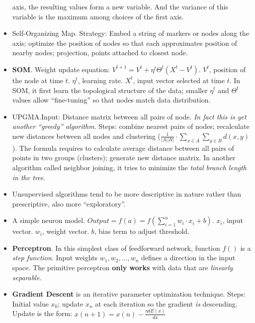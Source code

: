 \documentclass[twocolumn]{article}
\begin{document}
\begin{itemize}
  axis, the resulting values form a new variable. And the variance of
  this variable is the maximum among choices of the first axis.
\item Self-Organizing Map. Strategy: Embed a string of markers or
  nodes along the axis; optimize the position of nodes so that each
  approximates position of nearby nodes; projection, points attached
  to closest node.
\item \textbf{SOM}. Weight update equation:
  $V^{t+1}=V^{t}+\eta^{t}\Theta^{t}(X^{t}-V^{t})$. $V^{t}$, position
  of the node at time $t$. $\eta^{t}$, learning rate. $X^{t}$, input
  vector selected at time $t$. In SOM, it first learn the topological
  structure of the data; smaller $\eta^{t}$ and $\Theta^{t}$ values
  allow ``fine-tuning'' so that nodes match data distribution. 
\item UPGMA.\@ Input: Distance matrix between all pairs of
  node. \emph{In fact this is yet another ``greedy''
    algorithm}. Steps: combine nearest pairs of nodes; recalculate new
  distances between all nodes and clustering ($\frac{1}{|A||B|}\cdot
  \sum_{x\in A}\sum_{y\in B}d(x,y)$). The formula requires to
  calculate average distance between all pairs of points in two groups
  (clusters); generate new distance matrix. In another algorithm
  called neighbor joining, it tries to minimize the \emph{total branch
  length in the tree}.
\item Unsupervised algorithms tend to be more descriptive in nature
  rather than prescriptive, also more ``exploratory''. 
\item A simple neuron model. $Output=f(a)=f(\sum_{i=1}^{n}w_{i}\cdot
  x_{i}+b)$. $x_{i}$, input vector. $w_{i}$, weight vector. $b$, bias
  term to adjust threshold. 
\item \textbf{Perceptron}. In this simplest class of feedforward
  network, function $f()$ is a \emph{step function}. Input weights
  $w_{1},w_{2}, \ldots, w_{n}$ defines a direction in the input
  space. The primitive perceptron \textbf{only works} with data that
  are \emph{linearly separable}.
\item \textbf{Gradient Descent} is an iterative parameter optimization
  technique. Steps: Initial value $x_{0}$; update $x_{n}$ at each
  iteration so the gradient \emph{is} descending. Update is the form:
  $x(n+1)=x(n)-\frac{\eta dE(x)}{dx}$
\end{itemize}
\end{document}
